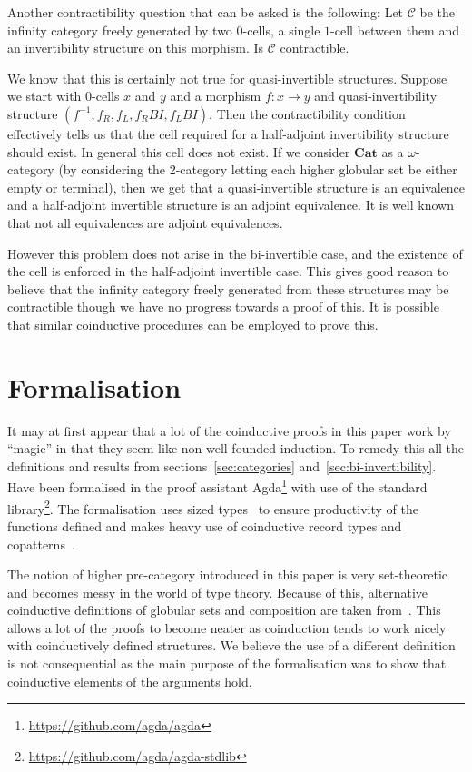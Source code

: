 \documentclass{article}
\theoremstyle{definition}
\theoremstyle{remark}
\newcommand{\inv}[1]{#1^{-1}}
\begin{document}
Another contractibility question that can be asked is the following: Let \(\mathcal{C}\) be the infinity category freely generated by two \(0\)-cells, a single \(1\)-cell between them and an invertibility structure on this morphism. Is \(\mathcal{C}\) contractible.

We know that this is certainly not true for quasi-invertible structures. Suppose we start with \(0\)-cells \(x\) and \(y\) and a morphism \(f : x \to y\) and quasi-invertibility structure \((\inv f, f_R, f_L, f_R{}BI, f_L{}BI)\). Then the contractibility condition effectively tells us that the cell required for a half-adjoint invertibility structure should exist. In general this cell does not exist. If we consider \(\mathbf{Cat}\) as a \(\omega\)-category (by considering the 2-category letting each higher globular set be either empty or terminal), then we get that a quasi-invertible structure is an equivalence and a half-adjoint invertible structure is an adjoint equivalence. It is well known that not all equivalences are adjoint equivalences.

However this problem does not arise in the bi-invertible case, and the existence of the cell is enforced in the half-adjoint invertible case. This gives good reason to believe that the infinity category freely generated from these structures may be contractible though we have no progress towards a proof of this. It is possible that similar coinductive procedures can be employed to prove this.

\section{Formalisation}\label{sec:formalisation}

It may at first appear that a lot of the coinductive proofs in this paper work by ``magic'' in that they seem like non-well founded induction. To remedy this all the definitions and results from  sections~\ref{sec:categories} and~\ref{sec:bi-invertibility}. Have been formalised in the proof assistant Agda\footnote{\url{https://github.com/agda/agda}} with use of the standard library\footnote{\url{https://github.com/agda/agda-stdlib}}. The formalisation uses sized types~\cite{Abel_2010} to ensure productivity of the functions defined and makes heavy use of coinductive record types and copatterns~\cite{10.1145/2480359.2429075}.

The notion of higher pre-category introduced in this paper is very set-theoretic and becomes messy in the world of type theory. Because of this, alternative coinductive definitions of globular sets and composition are taken from~\cite{hirschowitz_et_al:LIPIcs:2015:5166}. This allows a lot of the proofs to become neater as coinduction tends to work nicely with coinductively defined structures. We believe the use of a different definition is not consequential as the main purpose of the formalisation was to show that coinductive elements of the arguments hold.
\end{document}
